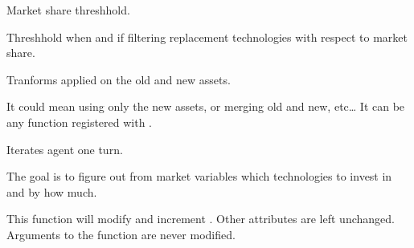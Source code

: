 \documentclass[letterpaper,10pt,english]{sphinxmanual}
\begin{document}
\begin{fulllineitems}
\begin{fulllineitems}
\end{fulllineitems}


\begin{fulllineitems}
\label{\detokenize{api:muse.agents.agent.Agent.maturity_threshhold}}
Market share threshhold.

Threshhold when and if filtering replacement technologies with respect
to market share.

\end{fulllineitems}


\begin{fulllineitems}
\label{\detokenize{api:muse.agents.agent.Agent.merge_transform}}
Tranforms applied on the old and new assets.

It could mean using only the new assets, or merging old and new, etc…
It can be any function registered with
.

\end{fulllineitems}


\begin{fulllineitems}
\label{\detokenize{api:muse.agents.agent.Agent.next}}
Iterates agent one turn.

The goal is to figure out from market variables which technologies to
invest in and by how much.

This function will modify  and increment .
Other attributes are left unchanged. Arguments to the function are
never modified.


\end{fulllineitems}
\end{fulllineitems}
\end{document}
